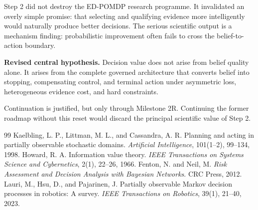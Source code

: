 \documentclass[11pt,a4paper]{article}
\begin{document}
Step 2 did not destroy the ED-POMDP research programme. It invalidated an overly simple promise: that selecting and qualifying evidence more intelligently would naturally produce better decisions. The serious scientific output is a mechanism finding: probabilistic improvement often fails to cross the belief-to-action boundary.

\begin{tcolorbox}[colback=softgreen,colframe=green!45!black,boxrule=0.8pt,arc=2mm]
\textbf{Revised central hypothesis.} Decision value does not arise from belief quality alone. It arises from the complete governed architecture that converts belief into stopping, compensating control, and terminal action under asymmetric loss, heterogeneous evidence cost, and hard constraints.
\end{tcolorbox}

Continuation is justified, but only through Milestone 2R. Continuing the former roadmap without this reset would discard the principal scientific value of Step 2.

\begin{thebibliography}{99}
 Kaelbling, L. P., Littman, M. L., and Cassandra, A. R. Planning and acting in partially observable stochastic domains. \emph{Artificial Intelligence}, 101(1--2), 99--134, 1998.
 Howard, R. A. Information value theory. \emph{IEEE Transactions on Systems Science and Cybernetics}, 2(1), 22--26, 1966.
 Fenton, N. and Neil, M. \emph{Risk Assessment and Decision Analysis with Bayesian Networks}. CRC Press, 2012.
 Lauri, M., Hsu, D., and Pajarinen, J. Partially observable Markov decision processes in robotics: A survey. \emph{IEEE Transactions on Robotics}, 39(1), 21--40, 2023.
\end{thebibliography}
\end{document}
